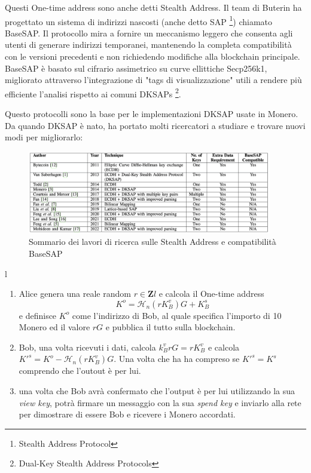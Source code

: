 \documentclass[12pt,a4paper]{article}
\begin{document}
Questi One-time address sono anche detti Stealth Address. Il team di Buterin ha
progettato un sistema di indirizzi nascosti (anche detto SAP \footnote{Stealth
Address Protocol}) chiamato BaseSAP. Il protocollo mira a fornire un meccanismo
leggero che consenta agli utenti di generare indirizzi temporanei, mantenendo la
completa compatibilità con le versioni precedenti e non richiedendo modifiche
alla blockchain principale. BaseSAP è basato sul cifrario assimetrico su curve
ellittiche Secp256k1, migliorato attraverso l'integrazione di "tags di
visualizzazione" utili a rendere più efficiente l'analisi rispetto ai comuni
DKSAPs \footnote{Dual-Key Stealth Address Protocols}.

Questo protocolli sono la base per le implementazioni DKSAP usate in Monero. Da
quando DKSAP è nato, ha portato molti ricercatori a studiare e trovare nuovi
modi per migliorarlo:

\begin{figure}[ht]
    \centering
    \includegraphics[width=0.95\textwidth]{./images/sommario.png}
    \caption{Sommario dei lavori di ricerca sulle Stealth Address e compatibilità BaseSAP}
    \label{fig:summary}
\end{figure}l

\begin{enumerate}
    \item Alice genera una reale random $r \in \mathbf{Z}l $ e calcola il
    One-time address $$ K^{o} = \mathcal{H}_n(rK^v_B)G+K^s_B $$ e definisce
    $K^{o}$ come l'indirizzo di Bob, al quale specifica l'importo di 10 Monero
    ed il valore $rG$ e pubblica il tutto sulla blockchain.
    \item Bob, una volta ricevuti i dati, calcola $k^v_BrG = rK^v_B$ e calcola
    ${K'}^s = K^o - \mathcal{H}_n(rK^v_B)G$. Una volta che ha ha compreso se
    $K'^s = K^s$ comprendo che l'outout è per lui.
    \item una volta che Bob avrà confermato che l'output è per lui utilizzando
    la sua \textit{view key}, potrà firmare un messaggio con la sua
    \textit{spend key} e inviarlo alla rete per dimostrare di essere Bob e
    ricevere i Monero accordati.
\end{enumerate}
\end{document}
